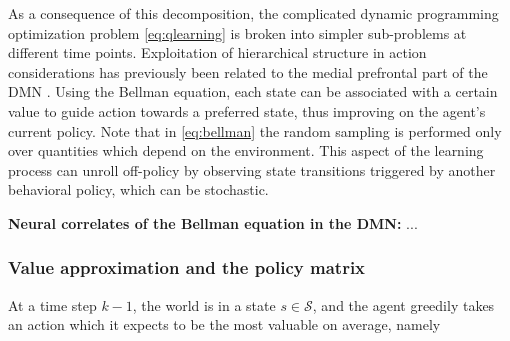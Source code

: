 \documentclass[10pt,letterpaper]{article}
\begin{document}
As a consequence of this decomposition, the complicated dynamic programming optimization
problem \eqref{eq:qlearning}
is broken into simpler sub-problems at different time points.
Exploitation of hierarchical structure in action considerations
has previously been related to the medial prefrontal part of the DMN
\citep{koechlin1999role, braver2002role}.
Using the Bellman equation, each state can be associated with a certain value
to guide action towards a preferred state, thus improving on the agent's current policy.
Note that in \eqref{eq:bellman} the random sampling
is performed only over quantities which
depend on the environment.
This aspect of the learning process
can unroll off-policy by observing state transitions
triggered by another behavioral policy, which can be stochastic.

\begin{mdframed}
  \textbf{ Neural correlates of the Bellman equation in the DMN:}
  ...
\end{mdframed}

\subsubsection{Value approximation and the policy matrix}
At a time step $k-1$, the world is in a state $s \in \mathcal S$, and the agent greedily takes an
action which it expects to be the most valuable on average, namely
\end{document}
